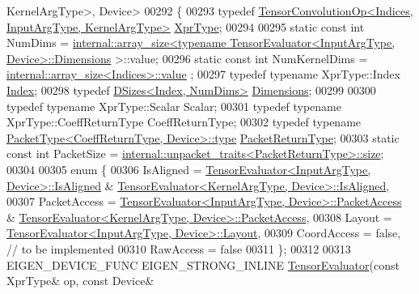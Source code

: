 \begin{DoxyCode}
      KernelArgType>, Device>
00292 \{
00293   \textcolor{keyword}{typedef} \hyperlink{class_eigen_1_1_tensor_convolution_op}{TensorConvolutionOp<Indices, InputArgType, KernelArgType>}
       \hyperlink{class_eigen_1_1_tensor_convolution_op}{XprType};
00294 
00295   \textcolor{keyword}{static} \textcolor{keyword}{const} \textcolor{keywordtype}{int} NumDims = 
      \hyperlink{struct_eigen_1_1internal_1_1array__size}{internal::array\_size<typename TensorEvaluator<InputArgType, Device>::Dimensions}
      >::value;
00296   \textcolor{keyword}{static} \textcolor{keyword}{const} \textcolor{keywordtype}{int} NumKernelDims = \hyperlink{struct_eigen_1_1internal_1_1array__size}{internal::array\_size<Indices>::value}
      ;
00297   \textcolor{keyword}{typedef} \textcolor{keyword}{typename} XprType::Index \hyperlink{namespace_eigen_a62e77e0933482dafde8fe197d9a2cfde}{Index};
00298   \textcolor{keyword}{typedef} \hyperlink{struct_eigen_1_1_d_sizes}{DSizes<Index, NumDims>} \hyperlink{struct_eigen_1_1_d_sizes}{Dimensions};
00299 
00300   \textcolor{keyword}{typedef} \textcolor{keyword}{typename} XprType::Scalar Scalar;
00301   \textcolor{keyword}{typedef} \textcolor{keyword}{typename} XprType::CoeffReturnType CoeffReturnType;
00302   \textcolor{keyword}{typedef} \textcolor{keyword}{typename} \hyperlink{group___sparse_core___module}{PacketType<CoeffReturnType, Device>::type} 
      \hyperlink{group___sparse_core___module}{PacketReturnType};
00303   \textcolor{keyword}{static} \textcolor{keyword}{const} \textcolor{keywordtype}{int} PacketSize = 
      \hyperlink{struct_eigen_1_1internal_1_1unpacket__traits}{internal::unpacket\_traits<PacketReturnType>::size};
00304 
00305   \textcolor{keyword}{enum} \{
00306     IsAligned = \hyperlink{struct_eigen_1_1_tensor_evaluator}{TensorEvaluator<InputArgType, Device>::IsAligned}
       & \hyperlink{struct_eigen_1_1_tensor_evaluator}{TensorEvaluator<KernelArgType, Device>::IsAligned},
00307     PacketAccess = \hyperlink{struct_eigen_1_1_tensor_evaluator}{TensorEvaluator<InputArgType, Device>::PacketAccess}
       & \hyperlink{struct_eigen_1_1_tensor_evaluator}{TensorEvaluator<KernelArgType, Device>::PacketAccess},
00308     Layout = \hyperlink{struct_eigen_1_1_tensor_evaluator}{TensorEvaluator<InputArgType, Device>::Layout},
00309     CoordAccess = \textcolor{keyword}{false},  \textcolor{comment}{// to be implemented}
00310     RawAccess = \textcolor{keyword}{false}
00311   \};
00312 
00313   EIGEN\_DEVICE\_FUNC EIGEN\_STRONG\_INLINE \hyperlink{struct_eigen_1_1_tensor_evaluator}{TensorEvaluator}(\textcolor{keyword}{const} XprType& op, \textcolor{keyword}{const} Device& 

\end{DoxyCode}
